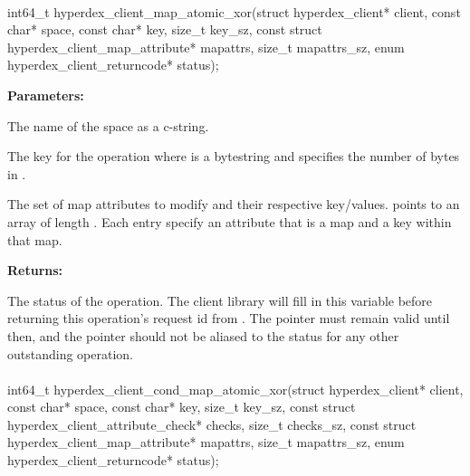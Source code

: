 \paragraph{}
\label{api:c:map_atomic_xor}
\begin{ccode}
int64_t hyperdex_client_map_atomic_xor(struct hyperdex_client* client,
                const char* space,
                const char* key, size_t key_sz,
                const struct hyperdex_client_map_attribute* mapattrs, size_t mapattrs_sz,
                enum hyperdex_client_returncode* status);
\end{ccode}
\funcdesc 

\noindent\textbf{Parameters:}
\begin{description}[labelindent=\widthof{{\code{mapattrs}, \code{mapattrs\_sz}}},leftmargin=*,noitemsep,nolistsep,align=right]
\item[\code{space}] The name of the space as a c-string.
\item[\code{key}, \code{key\_sz}] The key for the operation where  is a bytestring and  specifies the number of bytes in .
\item[\code{mapattrs}, \code{mapattrs\_sz}] The set of map attributes to modify and their respective key/values.   points to an array of length .  Each entry specify an attribute that is a map and a key within that map.
\end{description}

\noindent\textbf{Returns:}
\begin{description}[labelindent=\widthof{{\code{status}}},leftmargin=*,noitemsep,nolistsep,align=right]
\item[\code{status}] The status of the operation.  The client library will fill in this variable before returning this operation's request id from .  The pointer must remain valid until then, and the pointer should not be aliased to the status for any other outstanding operation.
\end{description}

\paragraph{}
\label{api:c:cond_map_atomic_xor}
\begin{ccode}
int64_t hyperdex_client_cond_map_atomic_xor(struct hyperdex_client* client,
                const char* space,
                const char* key, size_t key_sz,
                const struct hyperdex_client_attribute_check* checks, size_t checks_sz,
                const struct hyperdex_client_map_attribute* mapattrs, size_t mapattrs_sz,
                enum hyperdex_client_returncode* status);
\end{ccode}
\funcdesc 

